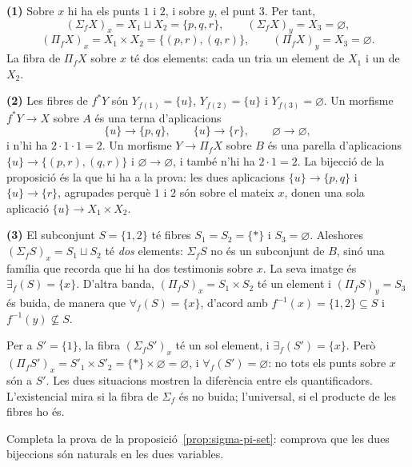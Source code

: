 \begin{solucio}
\textbf{(1)} Sobre $x$ hi ha els punts $1$ i $2$, i sobre $y$, el punt $3$. Per tant,
\[
(\Sigma_f X)_x=X_1\sqcup X_2=\{p,q,r\},\qquad(\Sigma_f X)_y=X_3=\varnothing,
\]
\[
(\Pi_f X)_x=X_1\times X_2=\{(p,r),(q,r)\},\qquad(\Pi_f X)_y=X_3=\varnothing.
\]
La fibra de $\Pi_f X$ sobre $x$ té dos elements: cada un tria un element de $X_1$ i un de $X_2$.

\textbf{(2)} Les fibres de $f^{*}Y$ són $Y_{f(1)}=\{u\}$, $Y_{f(2)}=\{u\}$ i $Y_{f(3)}=\varnothing$. Un morfisme $f^{*}Y\to X$ sobre $A$ és una terna d'aplicacions
\[
\{u\}\to\{p,q\},\qquad\{u\}\to\{r\},\qquad\varnothing\to\varnothing,
\]
i n'hi ha $2\cdot1\cdot1=2$. Un morfisme $Y\to\Pi_f X$ sobre $B$ és una parella d'aplicacions $\{u\}\to\{(p,r),(q,r)\}$ i $\varnothing\to\varnothing$, i també n'hi ha $2\cdot 1=2$. La bijecció de la proposició és la que hi ha a la prova: les dues aplicacions $\{u\}\to\{p,q\}$ i $\{u\}\to\{r\}$, agrupades perquè $1$ i $2$ són sobre el mateix $x$, donen una sola aplicació $\{u\}\to X_1\times X_2$.

\textbf{(3)} El subconjunt $S=\{1,2\}$ té fibres $S_1=S_2=\{\ast\}$ i $S_3=\varnothing$. Aleshores $(\Sigma_f S)_x=S_1\sqcup S_2$ té \emph{dos} elements: $\Sigma_f S$ no és un subconjunt de $B$, sinó una família que recorda que hi ha dos testimonis sobre $x$. La seva imatge és $\exists_f(S)=\{x\}$. D'altra banda, $(\Pi_f S)_x=S_1\times S_2$ té un element i $(\Pi_f S)_y=S_3$ és buida, de manera que $\forall_f(S)=\{x\}$, d'acord amb $f^{-1}(x)=\{1,2\}\subseteq S$ i $f^{-1}(y)\not\subseteq S$.

Per a $S'=\{1\}$, la fibra $(\Sigma_f S')_x$ té un sol element, i $\exists_f(S')=\{x\}$. Però $(\Pi_f S')_x=S'_1\times S'_2=\{\ast\}\times\varnothing=\varnothing$, i $\forall_f(S')=\varnothing$: no tots els punts sobre $x$ són a $S'$. Les dues situacions mostren la diferència entre els quantificadors. L'existencial mira si la fibra de $\Sigma_f$ és no buida; l'universal, si el producte de les fibres ho és.
\end{solucio}

\begin{exercici}\label{pr-sigma-pi-naturalitat}
Completa la prova de la proposició~\ref{prop:sigma-pi-set}: comprova que les dues bijeccions són naturals en les dues variables.
\end{exercici}

